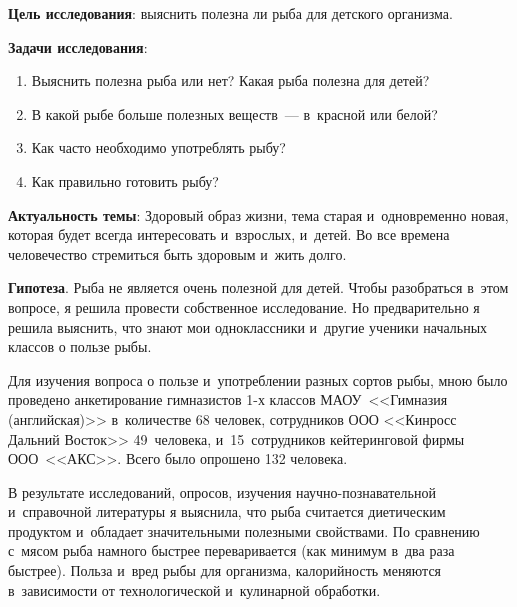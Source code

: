 


\makeProcTitleSchool




\textbf{Цель исследования}: выяснить полезна ли рыба для детского организма.

\textbf{Задачи исследования}:
\begin{enumerate}[noitemsep]\vspace{-8pt}
\item Выяснить полезна рыба или нет? Какая рыба полезна для детей?
\item В какой рыбе больше полезных веществ~--- в~красной или белой?
\item Как часто необходимо употреблять рыбу?
\item Как правильно готовить рыбу?
\end{enumerate}\vspace{-8pt}
\textbf{Актуальность темы}: Здоровый образ жизни, тема старая и~одновременно новая, которая будет всегда интересовать и~взрослых, и~детей. Во все времена человечество стремиться быть здоровым и~жить долго.

\textbf{Гипотеза}. Рыба не является очень полезной для детей. Чтобы разобраться в~этом вопросе, я решила провести собственное исследование. Но предварительно я решила выяснить, что знают мои одноклассники и~другие ученики начальных классов о пользе рыбы.

Для изучения вопроса о пользе и~употреблении разных сортов рыбы, мною было проведено анкетирование гимназистов 1-х классов МАОУ~<<Гимназия (английская)>> в~количестве 68 человек, сотрудников ООО <<Кинросс Дальний Восток>> 49~человека, и~15~сотрудников кейтеринговой фирмы ООО~<<АКС>>. Всего было опрошено 132 человека.

В результате исследований, опросов, изучения научно-познавательной и~справочной литературы я выяснила, что рыба считается диетическим продуктом и~обладает значительными полезными свойствами. По сравнению с~мясом рыба намного быстрее переваривается (как минимум в~два раза быстрее). Польза и~вред рыбы для организма, калорийность меняются в~зависимости от технологической и~кулинарной обработки.

